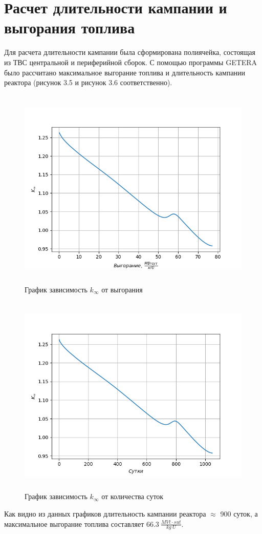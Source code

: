 \section{Расчет длительности кампании и выгорания топлива}

Для расчета длительности кампании была сформирована полиячейка,
состоящая из ТВС центральной и периферийной сборок. С помощью программы
GETERA было рассчитано максимальное выгорание топлива и длительность
кампании реактора (рисунок 3.5 и рисунок 3.6 соответственно).

\begin{figure}[!h]
\center
\includegraphics[width=5.11811in,height=3.80659in]{media/image17.png}
\caption{График зависимость \emph{$k_\infty$} от выгорания}
\end{figure}

\begin{figure}[!h]
\center
\includegraphics[width=5.11811in,height=3.80659in]{media/image18.png}
\caption{График зависимость \emph{$k_\infty$} от
количества суток}
\end{figure}

Как видно из данных графиков длительность кампании реактора $\approx$ 900 суток,
а максимальное выгорание топлива составляет
66.3\(\ \frac{MVt \cdot sut}{kg\ U}\).
